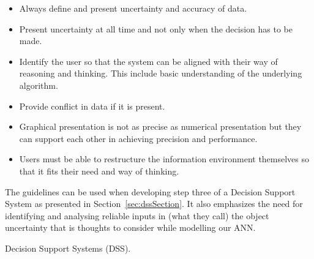 \begin{itemize}
\item Always define and present uncertainty and accuracy of data.
\item Present uncertainty at all time and not only when the decision has to be made.
\item Identify the user so that the system can be aligned with their way of reasoning and thinking. This include basic understanding of the underlying algorithm.
\item Provide conflict in data if it is present.
\item Graphical presentation is not as precise as numerical presentation but they can support each other in achieving precision and performance.
\item Users must be able to restructure the information environment themselves so that it fits their need and way of thinking.
\end{itemize}
The guidelines can be used when developing step three of a Decision Support System as presented in Section~\ref{sec:dssSection}. It also emphasizes the need for identifying and analysing reliable inputs in (what they call) the object uncertainty that is thoughts to consider while modelling our ANN. 

 Decision Support Systems (DSS).